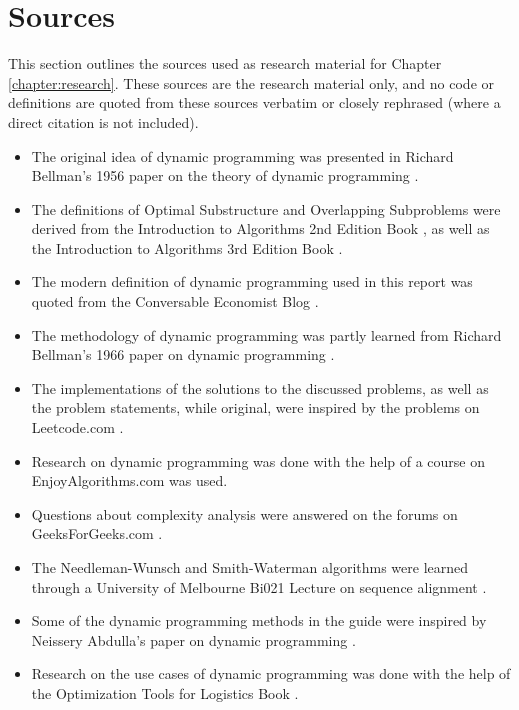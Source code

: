 \section{Sources}\label{sec:sources}
This section outlines the sources used as research material for Chapter \ref{chapter:research}.
These sources are the research material only, and no code or definitions are quoted from these sources verbatim or closely rephrased (where a direct citation is not included).
\begin{itemize}
    \item The original idea of dynamic programming was presented in Richard Bellman's 1956 paper on the theory of dynamic programming \cite{bellman1954theory}.
    \item The definitions of Optimal Substructure and Overlapping Subproblems were derived from the Introduction to Algorithms 2nd Edition Book \cite{algosbook1}, as well as the Introduction to Algorithms 3rd Edition Book \cite{algosbook2}.
    \item The modern definition of dynamic programming used in this report was quoted from the Conversable Economist Blog \cite{conversableeconomist}.
    \item The methodology of dynamic programming was partly learned from Richard Bellman's 1966 paper on dynamic programming \cite{bellman1966dynamic}.
    \item The implementations of the solutions to the discussed problems, as well as the problem statements, while original, were inspired by the problems on Leetcode.com \cite{leetcode}.
    \item Research on dynamic programming was done with the help of a course on EnjoyAlgorithms.com \cite{enjoyalgorithms} was used.
    \item Questions about complexity analysis were answered on the forums on GeeksForGeeks.com \cite{geeksforgeeks}.
    \item The Needleman-Wunsch and Smith-Waterman algorithms were learned through a University of Melbourne Bi021 Lecture on sequence alignment \cite{likic2008needleman}.
    \item Some of the dynamic programming methods in the guide were inspired by Neissery Abdulla's paper on dynamic programming \cite{abdulla2018dynamic}.
    \item Research on the use cases of dynamic programming was done with the help of the Optimization Tools for Logistics Book \cite{REVEILLAC201555}.
\end{itemize}



